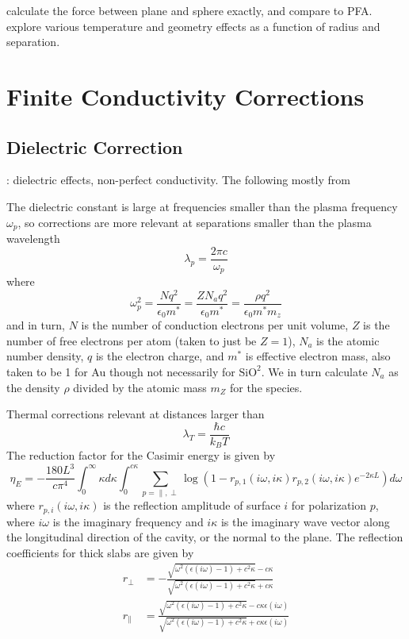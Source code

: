 \documentclass[11pt,traditabstract]{article}
\begin{document}
\citet{Bulgac} calculate the force between plane and sphere exactly, and compare to PFA. \citet{Durand} explore various temperature and geometry effects as a function of radius and separation. 

\section{Finite Conductivity Corrections}
\subsection{Dielectric Correction}
\citet{BeyondPFA,Lambrecht}: dielectric effects, non-perfect conductivity. The following mostly from \citet{Lambrecht}

The dielectric constant is large at frequencies smaller than the plasma frequency $\omega_p$, so corrections are more relevant at separations smaller than the plasma wavelength
$$
\lambda_p=\frac{2\pi c}{\omega_p}
$$
where
$$
\omega_p^2=\frac{Nq^2}{\epsilon_0m^*}=\frac{ZN_aq^2}{\epsilon_0m^*}=\frac{\rho q^2}{\epsilon_0m^*m_z}
$$
and in turn, $N$ is the number of conduction electrons per unit volume, $Z$ is the number of free electrons per atom (taken to just be $Z=1$), $N_a$ is the atomic number density, $q$ is the electron charge, and $m^*$ is effective electron mass, also taken to be 1 for Au though not necessarily for $\mathrm{SiO^2}$. We in turn calculate $N_a$ as the density $\rho$ divided by the atomic mass $m_Z$ for the species.

Thermal corrections relevant at distances larger than 
$$
\lambda_T=\frac{\hbar c}{k_B T}
$$
The reduction factor for the Casimir energy is given by
\begin{equation}
\eta_E=-\frac{180L^3}{c\pi^4}\int^{\infty}_{0}\kappa d\kappa\int^{c\kappa}_0\sum_{p=\parallel,\perp}\log{\left(1-r_{p,1}(i\omega,i\kappa)r_{p,2}(i\omega,i\kappa)e^{-2\kappa L}\right)}d\omega
\end{equation}
where $r_{p,i}(i\omega,i\kappa)$ is the reflection amplitude of surface $i$ for polarization $p$, where $i\omega$ is the imaginary frequency and $i\kappa$ is the imaginary wave vector along the longitudinal direction of the cavity, or the normal to the plane. The reflection coefficients for thick slabs are given by
\begin{align}
r_{\perp}&=-\frac{\sqrt{\omega^2(\epsilon(i\omega)-1)+c^2\kappa}-c\kappa}{\sqrt{\omega^2(\epsilon(i\omega)-1)+c^2\kappa}+c\kappa} \\
r_{\parallel}&=\frac{\sqrt{\omega^2(\epsilon(i\omega)-1)+c^2\kappa}-c\kappa\epsilon(i\omega)}{\sqrt{\omega^2(\epsilon(i\omega)-1)+c^2\kappa}+c\kappa\epsilon(i\omega)}
\end{align}
\end{document}
